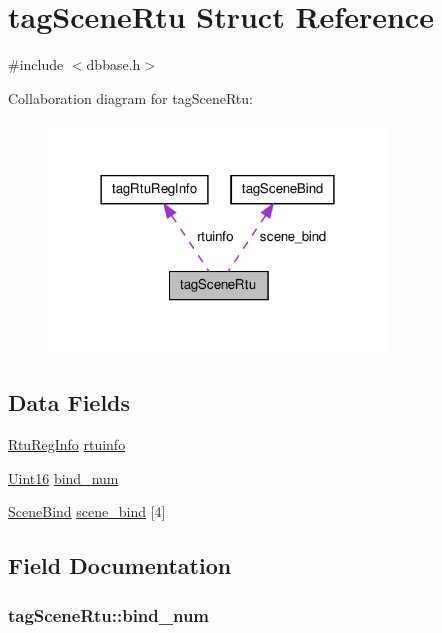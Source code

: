 \hypertarget{structtagSceneRtu}{\section{tag\-Scene\-Rtu Struct Reference}
\label{structtagSceneRtu}
}


{\ttfamily \#include $<$dbbase.\-h$>$}



Collaboration diagram for tag\-Scene\-Rtu\-:\nopagebreak
\begin{figure}[H]
\begin{center}
\leavevmode
\includegraphics[width=254pt]{structtagSceneRtu__coll__graph}
\end{center}
\end{figure}
\subsection*{Data Fields}
\begin{DoxyCompactItemize}
\item 
\hyperlink{dbbase_8h_a4f06859d090e81c1be0c142757ce6e11}{Rtu\-Reg\-Info} \hyperlink{structtagSceneRtu_aef53bec130f42a769962a12d7fbaaf86}{rtuinfo}
\item 
\hyperlink{base_8h_ae9f2e1f80fbd243687a04febbf590e13}{Uint16} \hyperlink{structtagSceneRtu_a01ec6b7f3d37b5fbb73393ee6eebfcca}{bind\-\_\-num}
\item 
\hyperlink{dbbase_8h_a2ae1e0e89451c2547ab21b1459817a19}{Scene\-Bind} \hyperlink{structtagSceneRtu_a98ab76ad18826ddb56000b4070ae3c7d}{scene\-\_\-bind} \mbox{[}4\mbox{]}
\end{DoxyCompactItemize}


\subsection{Field Documentation}
\hypertarget{structtagSceneRtu_a01ec6b7f3d37b5fbb73393ee6eebfcca}{
\subsubsection[{bind\-\_\-num}]{ tag\-Scene\-Rtu\-::bind\-\_\-num}}\label{structtagSceneRtu_a01ec6b7f3d37b5fbb73393ee6eebfcca}


